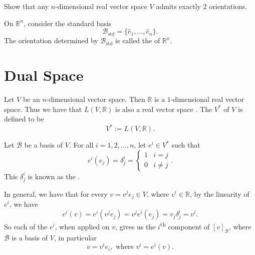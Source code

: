\documentclass[notoc,notitlepage]{tufte-book}
\DeclareMathOperator{\std}{std}
\begin{document}
\begin{ex}[A1Q1]
  Show that any $n$-dimensional real vector space $V$ admits exactly 2 orientations.
\end{ex}

\begin{eg}
  On $\mathbb{R}^n$, consider the standard basis
  \begin{equation*}
    \mathcal{B}_{\std} = \{ \hat{e}_1, \ldots, \hat{e}_n \}.
  \end{equation*}
  The orientation determined by $\mathcal{B}_{\std}$ is called the  of $\mathbb{R}^n$.
\end{eg}


\section{Dual Space}%
\label{sec:dual_space}

\begin{defn}\label{defn:dual_space}
  Let $V$ be an $n$-dimensional vector space.
  Then $\mathbb{R}$ is a $1$-dimensional real vector space.
  Thus we have that $L(V, \mathbb{R})$ is also a real vector space
  .
  The  $V^*$ of $V$ is defined to be
  \begin{equation*}
    V^* := L(V, \mathbb{R}).
  \end{equation*}
\end{defn}

Let $\mathcal{B}$ be a basis of $V$. For all $i = 1, 2, \ldots, n$, let $e^i \in V^*$ such that
\begin{equation*}
  e^i(e_j) = \delta^i_j = \begin{cases}
    1 & i = j \\
    0 & i \neq j
  \end{cases}.
\end{equation*}
This $\delta^i_j$ is known as the .

In general, we have that for every $v = v^j e_j \in V$, where $v^i \in \mathbb{R}$,
by the linearity of $e^i$, we have
\begin{equation*}
  e^i(v) = e^i(v^j e_j) = v^j e^i(e_j) = v_j \delta^i_j = v^i.
\end{equation*}
So each of the $e^i$, when applied on $v$,
gives us the $i$\textsuperscript{th} component of $[v]_{\mathcal{B}}$,
where $\mathcal{B}$ is a basis of $V$, in particular
\begin{equation}\label{eq:v_wrt_basis}
  v = v^i e_i, \text{ where } v^i = e^i(v).
\end{equation}
\end{document}
